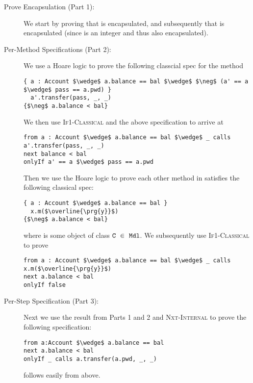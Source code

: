 \documentclass[acmsmall,review,anonymous]{acmart}\settopmatter{printfolios=true,printccs=false,printacmref=false}
\begin{document}
\begin{description}
\item[Prove Encapsulation (Part 1):]
We start by proving that  is encapsulated, and subsequently that  is encapsulated (since  is an integer and thus also encapsulated).
\item[Per-Method \Nec Specifications (Part 2):]
We use a Hoare logic to prove the following classcial spec for the  
method
\begin{lstlisting}[language = Chainmail, mathescape = true, frame = lines]
{ a : Account $\wedge$ a.balance == bal $\wedge$ $\neg$ (a' == a $\wedge$ pass == a.pwd) }
  a'.transfer(pass, _, _)
{$\neg$ a.balance < bal}
\end{lstlisting}
We then use \textsc{If1-Classical} and the above specification to arrive at
\begin{lstlisting}[language = Chainmail, mathescape = true, frame = lines]
from a : Account $\wedge$ a.balance == bal $\wedge$ _ calls a'.transfer(pass, _, _) 
next balance < bal
onlyIf a' == a $\wedge$ pass == a.pwd
\end{lstlisting}
Then we use the Hoare logic to prove each other method in  satisfies the following 
classical spec:
\begin{lstlisting}[language = Chainmail, mathescape = true, frame = lines]
{ a : Account $\wedge$ a.balance == bal }
  x.m($\overline{\prg{y}}$)
{$\neg$ a.balance < bal}
\end{lstlisting}
where  is some object of class $\prg{C}\ \in\ \prg{Mdl}$. 
We subsequently use \textsc{If1-Classical} to prove
\begin{lstlisting}[language = Chainmail, mathescape = true, frame = lines]
from a : Account $\wedge$ a.balance == bal $\wedge$ _ calls x.m($\overline{\prg{y}}$)
next a.balance < bal
onlyIf false
\end{lstlisting}

\item[Per-Step \Nec Specification (Part 3):]
Next we use the result from Parts 1 and 2 and \textsc{Nxt-Internal} to 
prove the following \Nec specification:
\begin{lstlisting}[language = Chainmail, mathescape = true, frame = lines]
from a:Account $\wedge$ a.balance == bal
next a.balance < bal
onlyIf _ calls a.transfer(a.pwd, _, _)
\end{lstlisting}
 follows easily from above.
\end{description}
\end{document}
